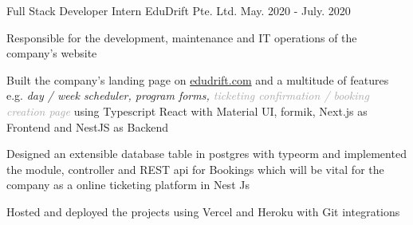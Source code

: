

\begin{cventries}

  \cventry
    {Full Stack Developer Intern} %
    {EduDrift Pte. Ltd.} %
    {} %
    {May. 2020 - July. 2020} %
    {
      \begin{cvitems} %
        \item {Responsible for the development, maintenance and IT operations of the company's website}
        \item {Built the company's landing page on \textcolor{eduDft-darkblue}{\href{https://edudrift.com}{edudrift.com}} and a multitude of features e.g. \textit{day / week scheduler, program forms, \textcolor{darkgray}{ticketing confirmation / booking creation page}} using Typescript React with Material UI, formik, Next.js as Frontend and NestJS as Backend}
        \item {Designed an extensible database table in postgres with typeorm and implemented the module, controller and REST api for Bookings which will be vital for the company as a online ticketing platform in Nest Js}
        \item {Hosted and deployed the projects using Vercel and Heroku with Git integrations}
      \end{cvitems}
    }

\end{cventries}
